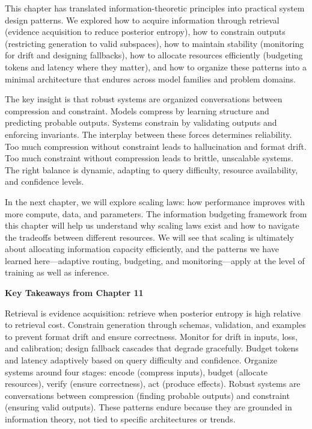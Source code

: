 \vspace{1em}

This chapter has translated information-theoretic principles into practical system design patterns. We explored how to acquire information through retrieval (evidence acquisition to reduce posterior entropy), how to constrain outputs (restricting generation to valid subspaces), how to maintain stability (monitoring for drift and designing fallbacks), how to allocate resources efficiently (budgeting tokens and latency where they matter), and how to organize these patterns into a minimal architecture that endures across model families and problem domains.

The key insight is that robust systems are organized conversations between compression and constraint. Models compress by learning structure and predicting probable outputs. Systems constrain by validating outputs and enforcing invariants. The interplay between these forces determines reliability. Too much compression without constraint leads to hallucination and format drift. Too much constraint without compression leads to brittle, unscalable systems. The right balance is dynamic, adapting to query difficulty, resource availability, and confidence levels.

In the next chapter, we will explore scaling laws: how performance improves with more compute, data, and parameters. The information budgeting framework from this chapter will help us understand why scaling laws exist and how to navigate the tradeoffs between different resources. We will see that scaling is ultimately about allocating information capacity efficiently, and the patterns we have learned here—adaptive routing, budgeting, and monitoring—apply at the level of training as well as inference.

\vspace{1em}

\begin{pausebox}
\textbf{Key Takeaways from Chapter 11}

Retrieval is evidence acquisition: retrieve when posterior entropy is high relative to retrieval cost. Constrain generation through schemas, validation, and examples to prevent format drift and ensure correctness. Monitor for drift in inputs, loss, and calibration; design fallback cascades that degrade gracefully. Budget tokens and latency adaptively based on query difficulty and confidence. Organize systems around four stages: encode (compress inputs), budget (allocate resources), verify (ensure correctness), act (produce effects). Robust systems are conversations between compression (finding probable outputs) and constraint (ensuring valid outputs). These patterns endure because they are grounded in information theory, not tied to specific architectures or trends.
\end{pausebox}
